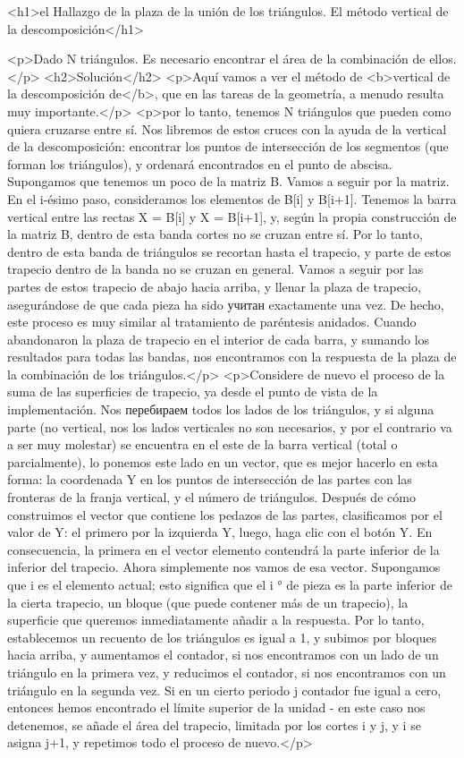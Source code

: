 <h1>el Hallazgo de la plaza de la unión de los triángulos. El método vertical de la descomposición</h1>

<p>Dado N triángulos. Es necesario encontrar el área de la combinación de ellos.</p>
<h2>Solución</h2>
<p>Aquí vamos a ver el método de <b>vertical de la descomposición de</b>, que en las tareas de la geometría, a menudo resulta muy importante.</p>
<p>por lo tanto, tenemos N triángulos que pueden como quiera cruzarse entre sí. Nos libremos de estos cruces con la ayuda de la vertical de la descomposición: encontrar los puntos de intersección de los segmentos (que forman los triángulos), y ordenará encontrados en el punto de abscisa. Supongamos que tenemos un poco de la matriz B. Vamos a seguir por la matriz. En el i-ésimo paso, consideramos los elementos de B[i] y B[i+1]. Tenemos la barra vertical entre las rectas X = B[i] y X = B[i+1], y, según la propia construcción de la matriz B, dentro de esta banda cortes no se cruzan entre sí. Por lo tanto, dentro de esta banda de triángulos se recortan hasta el trapecio, y parte de estos trapecio dentro de la banda no se cruzan en general. Vamos a seguir por las partes de estos trapecio de abajo hacia arriba, y llenar la plaza de trapecio, asegurándose de que cada pieza ha sido учитан exactamente una vez. De hecho, este proceso es muy similar al tratamiento de paréntesis anidados. Cuando abandonaron la plaza de trapecio en el interior de cada barra, y sumando los resultados para todas las bandas, nos encontramos con la respuesta de la plaza de la combinación de los triángulos.</p>
<p>Considere de nuevo el proceso de la suma de las superficies de trapecio, ya desde el punto de vista de la implementación. Nos перебираем todos los lados de los triángulos, y si alguna parte (no vertical, nos los lados verticales no son necesarios, y por el contrario va a ser muy molestar) se encuentra en el este de la barra vertical (total o parcialmente), lo ponemos este lado en un vector, que es mejor hacerlo en esta forma: la coordenada Y en los puntos de intersección de las partes con las fronteras de la franja vertical, y el número de triángulos. Después de cómo construimos el vector que contiene los pedazos de las partes, clasificamos por el valor de Y: el primero por la izquierda Y, luego, haga clic con el botón Y. En consecuencia, la primera en el vector elemento contendrá la parte inferior de la inferior del trapecio. Ahora simplemente nos vamos de esa vector. Supongamos que i es el elemento actual; esto significa que el i ° de pieza es la parte inferior de la cierta trapecio, un bloque (que puede contener más de un trapecio), la superficie que queremos inmediatamente añadir a la respuesta. Por lo tanto, establecemos un recuento de los triángulos es igual a 1, y subimos por bloques hacia arriba, y aumentamos el contador, si nos encontramos con un lado de un triángulo en la primera vez, y reducimos el contador, si nos encontramos con un triángulo en la segunda vez. Si en un cierto periodo j contador fue igual a cero, entonces hemos encontrado el límite superior de la unidad - en este caso nos detenemos, se añade el área del trapecio, limitada por los cortes i y j, y i se asigna j+1, y repetimos todo el proceso de nuevo.</p>
